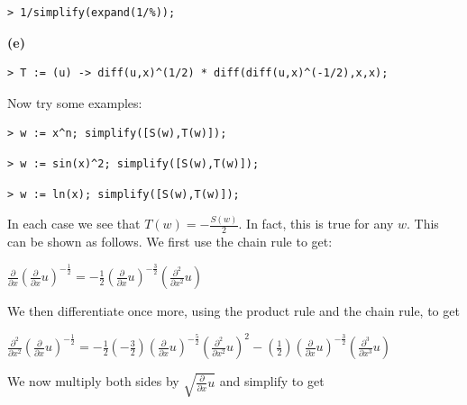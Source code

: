 \documentclass{article}
\begin{document}
\begin{lstlisting}
> 1/simplify(expand(1/%));
\end{lstlisting}
\begin{Maple Normal}
\textbf{(e)}
\end{Maple Normal}
\begin{lstlisting}
> T := (u) -> diff(u,x)^(1/2) * diff(diff(u,x)^(-1/2),x,x);
\end{lstlisting}
\begin{Maple Normal}
Now try some examples:
\end{Maple Normal}
\begin{lstlisting}
> w := x^n; simplify([S(w),T(w)]);
\end{lstlisting}
\begin{lstlisting}
> w := sin(x)^2; simplify([S(w),T(w)]);
\end{lstlisting}
\begin{lstlisting}
> w := ln(x); simplify([S(w),T(w)]);
\end{lstlisting}
\begin{Maple Normal}
In each case we see that 
$T (w)=-\frac{S (w)}{2}$.  In fact, this is true for any 
$w $.  This can be shown as follows.  We first use the chain rule to get:
\end{Maple Normal}
\begin{center}
$\displaystyle \frac{\partial}{\partial x} (\frac{\partial}{\partial x} u)^{-\frac{1}{2}}=-\frac{1}{2} (\frac{\partial}{\partial x} u)^{-\frac{3}{2}} (\frac{\partial^{2}}{\partial x^{2}} u)$\end{center}
\begin{Maple Normal}

\end{Maple Normal}
\begin{Maple Normal}
We then differentiate once more, using the product rule and the chain rule, to get 
\end{Maple Normal}
\begin{center}
$\displaystyle \frac{\partial^{2}}{\partial x^{2}} (\frac{\partial}{\partial x} u)^{-\frac{1}{2}}=-\frac{1}{2} (-\frac{3}{2}) (\frac{\partial}{\partial x} u)^{-\frac{5}{2}} (\frac{\partial^{2}}{\partial x^{2}} u)^{2}-(\frac{1}{2}) (\frac{\partial}{\partial x} u)^{-\frac{3}{2}} (\frac{\partial^{3}}{\partial x^{3}} u)$\end{center}
\begin{Maple Normal}

\end{Maple Normal}
\begin{Maple Normal}
We now multiply both sides by 
$\sqrt{\frac{\partial}{\partial x} u}$ and simplify to get
\end{Maple Normal}
\end{document}
